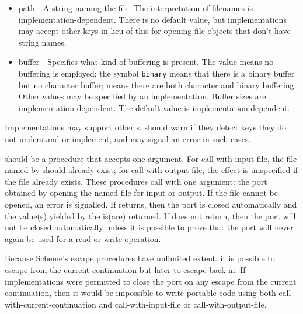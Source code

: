 \begin{itemize}

\item {\cf path} - A string naming the file.  The interpretation of
  filenames is implementation-dependent.  There is no default value,
  but implementations may accept other keys in lieu of this for
  opening file objects that don't have string names.

\item {\cf buffer} - Specifies what kind of buffering is present.  The
  value \schfalse{} means no buffering is employed; the symbol
  \texttt{binary} means that there is a binary buffer but no character
  buffer; \schtrue{} means there are both character and binary
  buffering.  Other values may be specified by an implementation.
  Buffer sizes are implementation-dependent.  The default value is
  implementation-dependent.

\end{itemize}

Implementations may support other s, should warn if they
detect keys they do not understand or implement, and may signal an
error in such cases.

\begin{entry}{%
}

 should be a procedure that accepts one argument.
For {\cf call-with-input-file},
the file named by  should already exist; for
{\cf call-with-output-file},
the effect is unspecified if the file
already exists. These procedures call  with one argument: the
port obtained by opening the named file for input or output.  If the
file cannot be opened, an error is signalled.  If  returns,
then the port is closed automatically and the value(s) yielded by the
 is(are) returned.  If  does not return, then 
the port will not be closed automatically unless it is possible to
prove that the port will never again be used for a read or write
operation.

\begin{rationale}
Because Scheme's escape procedures have unlimited extent, it  is
possible to escape from the current continuation but later to escape back in. 
If implementations were permitted to close the port on any escape from the
current continuation, then it would be impossible to write portable code using
both {\cf call-with-current-continuation} and {\cf call-with-input-file} or
{\cf call-with-output-file}.
\end{rationale} 
\end{entry}


